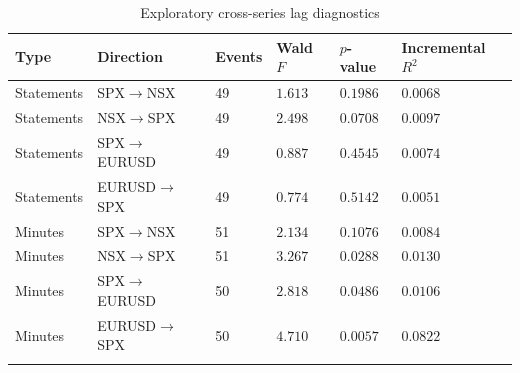 \begin{table}[htbp]
\centering
{\fontsize{9.5}{12}\selectfont\renewcommand{\arraystretch}{1.22}\setlength{\tabcolsep}{4pt}
\begin{tabularx}{\linewidth}{@{}L{25mm}L{40mm}C{17mm}C{23mm}C{23mm}X@{}}
\toprule{}
\textbf{Type} & \textbf{Direction} & \textbf{Events} & \textbf{Wald $F$} & \textbf{$p$-value} & \textbf{Incremental $R^2$} \\ \midrule
Statements & SPX$\to$NSX & 49 & $1.613$ & $0.1986$ & $0.0068$ \\ \hline
Statements & NSX$\to$SPX & 49 & $2.498$ & $0.0708$ & $0.0097$ \\ \hline
Statements & SPX$\to$EURUSD & 49 & $0.887$ & $0.4545$ & $0.0074$ \\ \hline
Statements & EURUSD$\to$SPX & 49 & $0.774$ & $0.5142$ & $0.0051$ \\ \hline
Minutes & SPX$\to$NSX & 51 & $2.134$ & $0.1076$ & $0.0084$ \\ \hline
Minutes & NSX$\to$SPX & 51 & $3.267$ & $0.0288$ & $0.0130$ \\ \hline
Minutes & SPX$\to$EURUSD & 50 & $2.818$ & $0.0486$ & $0.0106$ \\ \hline
Minutes & EURUSD$\to$SPX & 50 & $4.710$ & $0.0057$ & $0.0822$ \\ \hline
{}\bottomrule\end{tabularx}}
\caption[Exploratory cross-series lag diagnostics]{Exploratory cross-series lag diagnostics}\label{tab:lead-lag}
\end{table}
